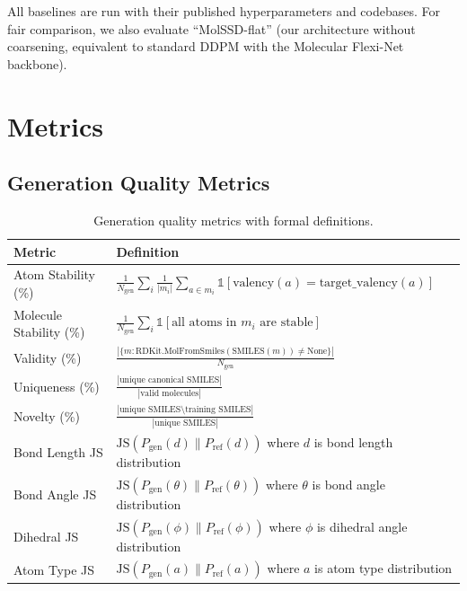\documentclass[12pt,a4paper]{article}
\begin{document}
All baselines are run with their published hyperparameters and codebases. For fair comparison, we also evaluate ``MolSSD-flat'' (our architecture without coarsening, equivalent to standard DDPM with the Molecular Flexi-Net backbone).

\section{Metrics}\label{sec:metrics}

\subsection{Generation Quality Metrics}

\begin{table}[H]
\centering
\caption{Generation quality metrics with formal definitions.}
\label{tab:metrics_quality}
\begin{tabular}{p{3.5cm}p{9cm}}
\toprule
\textbf{Metric} & \textbf{Definition} \\
\midrule
Atom Stability (\%) & $\frac{1}{N_{\text{gen}}} \sum_i \frac{1}{|m_i|} \sum_{a \in m_i} \mathds{1}[\text{valency}(a) = \text{target\_valency}(a)]$ \\
\midrule
Molecule Stability (\%) & $\frac{1}{N_{\text{gen}}} \sum_i \mathds{1}[\text{all atoms in } m_i \text{ are stable}]$ \\
\midrule
Validity (\%) & $\frac{|\{m : \text{RDKit.MolFromSmiles}(\text{SMILES}(m)) \neq \text{None}\}|}{N_{\text{gen}}}$ \\
\midrule
Uniqueness (\%) & $\frac{|\text{unique canonical SMILES}|}{|\text{valid molecules}|}$ \\
\midrule
Novelty (\%) & $\frac{|\text{unique SMILES} \setminus \text{training SMILES}|}{|\text{unique SMILES}|}$ \\
\midrule
Bond Length JS & $\text{JS}(P_{\text{gen}}(d) \| P_{\text{ref}}(d))$ where $d$ is bond length distribution \\
\midrule
Bond Angle JS & $\text{JS}(P_{\text{gen}}(\theta) \| P_{\text{ref}}(\theta))$ where $\theta$ is bond angle distribution \\
\midrule
Dihedral JS & $\text{JS}(P_{\text{gen}}(\phi) \| P_{\text{ref}}(\phi))$ where $\phi$ is dihedral angle distribution \\
\midrule
Atom Type JS & $\text{JS}(P_{\text{gen}}(a) \| P_{\text{ref}}(a))$ where $a$ is atom type distribution \\
\bottomrule
\end{tabular}
\end{table}
\end{document}
